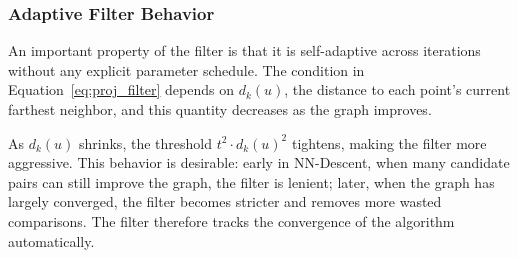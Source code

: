 \subsubsection{Adaptive Filter Behavior}
\label{sec:adaptive}

An important property of the filter is that it is self-adaptive across iterations without any explicit parameter schedule. The condition in Equation~\eqref{eq:proj_filter} depends on $d_k(u)$, the distance to each point's current farthest neighbor, and this quantity decreases as the graph improves.

As $d_k(u)$ shrinks, the threshold $t^2 \cdot d_k(u)^2$ tightens, making the filter more aggressive. This behavior is desirable: early in NN-Descent, when many candidate pairs can still improve the graph, the filter is lenient; later, when the graph has largely converged, the filter becomes stricter and removes more wasted comparisons. The filter therefore tracks the convergence of the algorithm automatically.
